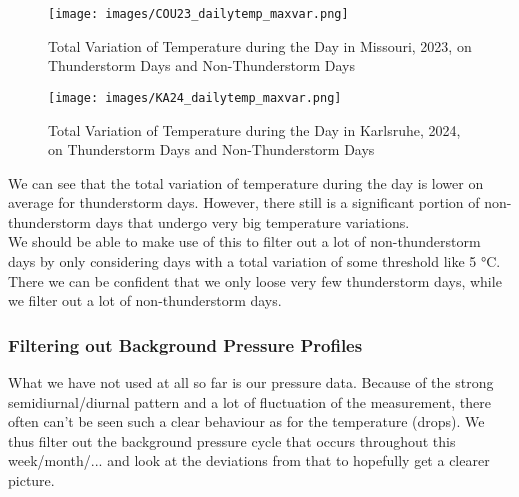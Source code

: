 \documentclass[12pt, parskip=half]{scrartcl}
\begin{document}
\begin{figure}[!h]
\centering
\texttt{[image: images/COU23\_dailytemp\_maxvar.png]}
\caption{Total Variation of Temperature during the Day in Missouri, 2023, on Thunderstorm Days and Non-Thunderstorm Days}
\end{figure}

\begin{figure}[!h]
\centering
\texttt{[image: images/KA24\_dailytemp\_maxvar.png]}
\caption{Total Variation of Temperature during the Day in Karlsruhe, 2024, on Thunderstorm Days and Non-Thunderstorm Days}
\end{figure}

We can see that the total variation of temperature during the day is lower on average for thunderstorm days.
However, there still is a significant portion of non-thunderstorm days that undergo very big temperature variations.\\

We should be able to make use of this to filter out a lot of non-thunderstorm days by only considering days with a total variation of some threshold like 5 °C.
There we can be confident that we only loose very few thunderstorm days, while we filter out a lot of non-thunderstorm days.

\subsubsection{Filtering out Background Pressure Profiles}
What we have not used at all so far is our pressure data. Because of the strong semidiurnal/diurnal pattern and a lot of fluctuation of the measurement, there often can't be seen such a clear behaviour as for the temperature (drops). 
We thus filter out the background pressure cycle that occurs throughout this week/month/... and look at the deviations from that to hopefully get a clearer picture.
\end{document}
